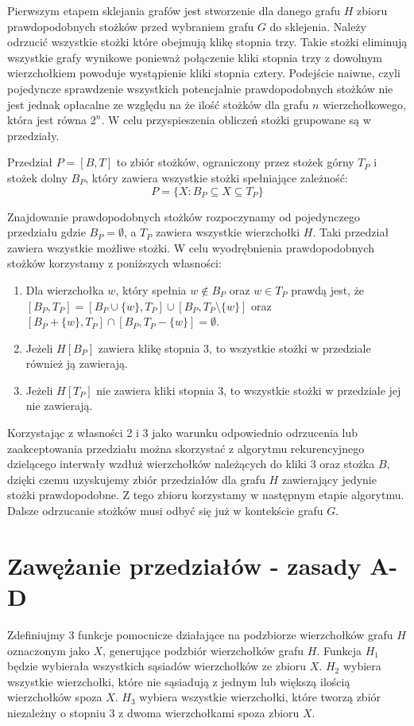 Pierwszym etapem sklejania grafów jest stworzenie dla danego grafu $H$ zbioru prawdopodobnych stożków przed wybraniem grafu $G$ do sklejenia. Należy odrzucić wszystkie stożki które obejmują klikę stopnia trzy. Takie stożki eliminują wszystkie grafy wynikowe ponieważ połączenie kliki stopnia trzy z dowolnym wierzchołkiem powoduje wystąpienie kliki stopnia cztery. Podejście naiwne, czyli pojedyncze sprawdzenie wszystkich potencjalnie prawdopodobnych stożków nie jest jednak opłacalne ze względu na że ilość stożków dla grafu $n$ wierzchołkowego, która jest równa $2^n$. W celu przyspieszenia obliczeń stożki grupowane są w przedziały. 

\begin{definition}
Przedział $P = [B, T]$ to zbiór stożków, ograniczony przez stożek górny $T_P$ i stożek dolny $B_P$, który zawiera wszystkie stożki spełniające zależność:  $$P=\{X: B_P \subseteq X \subseteq T_P\}$$ 
\end{definition}


Znajdowanie prawdopodobnych stożków rozpoczynamy od pojedynczego przedziału gdzie $B_P = \emptyset$, a $T_P$ zawiera wszystkie wierzchołki $H$. Taki przedział zawiera wszystkie możliwe stożki. W celu wyodrębnienia prawdopodobnych stożków korzystamy z poniższych własności:
\begin{enumerate}
\item Dla wierzchołka $w$, który spełnia $w \notin B_P$ oraz $w\in T_P$ prawdą jest, że $[B_P, T_P] = [B_P \cup \{ w\}, T_P] \cup [B_P , T_P \setminus \{ w\}]$ oraz $[B_P +\{ w\}, T_P] \cap [B_P , T_P - \{ w\}] = \emptyset$. 

\item Jeżeli $H[B_P]$ zawiera klikę stopnia 3, to wszystkie stożki w przedziale również ją zawierają. 

\item Jeżeli $H[T_P]$ nie zawiera kliki stopnia 3, to wszystkie stożki w przedziale jej nie zawierają.
\end{enumerate}

Korzystając z własności 2 i 3 jako warunku odpowiednio odrzucenia lub zaakceptowania przedziału można skorzystać z algorytmu rekurencyjnego dzielącego interwały wzdłuż wierzchołków należących do kliki 3 oraz stożka $B$, dzięki czemu uzyskujemy zbiór przedziałów dla grafu $H$ zawierający jedynie stożki prawdopodobne. Z tego zbioru korzystamy w następnym etapie algorytmu.
Dalsze odrzucanie stożków musi odbyć się już w kontekście grafu $G$.
  

\section{Zawężanie przedziałów - zasady A-D}
Zdefiniujmy 3 funkcje pomocnicze działające na podzbiorze wierzchołków grafu $H$ oznaczonym jako $X$, generujące podzbiór wierzchołków grafu $H$. 
Funkcja $H_1$ będzie wybierała wszystkich sąsiadów wierzchołków ze zbioru $X$.
$H_2$ wybiera wszystkie wierzchołki, które nie sąsiadują z jednym lub większą ilością wierzchołków spoza $X$. 
$H_3$ wybiera wszystkie wierzchołki, które tworzą zbiór niezależny o stopniu 3 z dwoma wierzchołkami spoza zbioru $X$.

